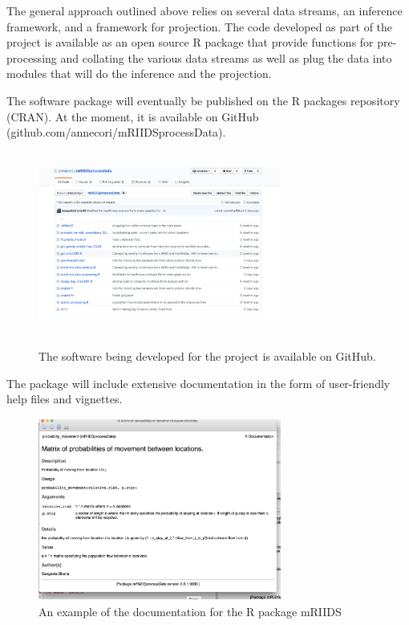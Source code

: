 \documentclass[11pt,]{article}
\begin{document}
The general approach outlined above relies on several data streams, an
inference framework, and a framework for projection. The code
developed as part of the project is available as an open
source R package that provide functions for pre-processing and
collating the various data streams as well as plug the data into
modules that will do the inference and the projection. 

The software
package will eventually be published on the R packages repository
(CRAN). At the moment, it is available on GitHub (github.com/annecori/mRIIDSprocessData).

\begin{figure}
   \centering
  \includegraphics[width=8cm, height = 6cm]{ms6-figures/github-screenshot}
  \label{fig:github}
  \caption{The software being developed for the project is available
    on GitHub.}
\end{figure}


The package will include extensive documentation in the form of
user-friendly help files and vignettes.


\begin{figure}
  \centering
  \includegraphics[width=8cm, height = 6cm]{ms6-figures/Helpfile-screenshot}
  \caption{An example of the documentation for the R package mRIIDS}
  \label{fig:helpfile}
\end{figure}
\end{document}
